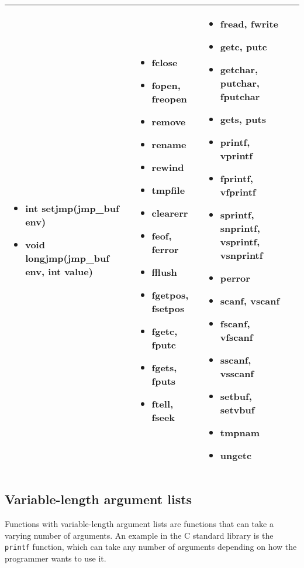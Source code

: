\begin{table*}[h]
\begin{tabular}{|p{3cm}|p{3cm}|p{3cm}|p{6.5cm}|}
\begin{itemize}
\setlength{\itemsep}{0cm}
\setlength{\parskip}{0cm}
	\item int setjmp(jmp\_buf env)
	\item void longjmp(jmp\_buf env, int value)
\end{itemize}
 &  \begin{itemize}
\setlength{\itemsep}{0cm}
\setlength{\parskip}{0cm}
	\item fclose
	\item fopen, freopen
	\item remove
	\item rename
	\item rewind
	\item tmpfile
	\item clearerr
	\item feof, ferror
	\item fflush
	\item fgetpos, fsetpos
	\item fgetc, fputc
	\item fgets, fputs
	\item ftell, fseek
\end{itemize}
 &  \begin{itemize}
\setlength{\itemsep}{0cm}
\setlength{\parskip}{0cm}
	\item fread, fwrite
	\item getc, putc
	\item getchar, putchar, fputchar
	\item gets, puts
	\item printf, vprintf
	\item fprintf, vfprintf
	\item sprintf, snprintf, vsprintf, vsnprintf
	\item perror
	\item scanf, vscanf
	\item fscanf, vfscanf
	\item sscanf, vsscanf
	\item setbuf, setvbuf
	\item tmpnam
	\item ungetc
\end{itemize}
 \\ \hline
	\end{tabular}
\end{table*}

\subsection{Variable-length argument lists}
Functions with variable-length argument lists are functions that can take a
varying number of arguments. An example in the C standard library is the
\texttt{printf} function, which can take any number of arguments depending on
how the programmer wants to use it.

